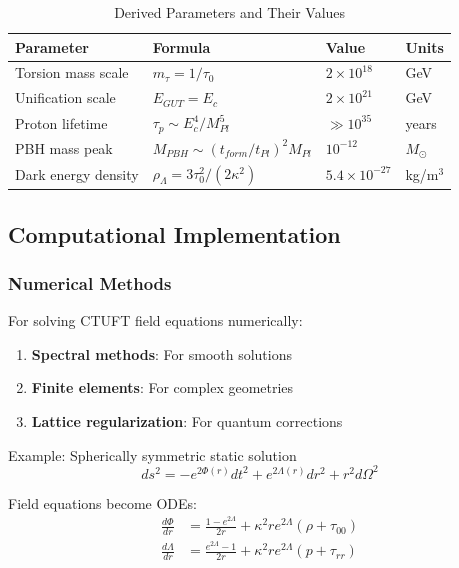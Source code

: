 \begin{table}[htbp]
\centering
\caption{Derived Parameters and Their Values}
\begin{tabular}{@{}llll@{}}
\toprule
\textbf{Parameter} & \textbf{Formula} & \textbf{Value} & \textbf{Units} \\
\midrule
Torsion mass scale & $m_\tau = 1/\tau_0$ & $2 \times 10^{18}$ & GeV \\
Unification scale & $E_{GUT} = E_c$ & $2 \times 10^{21}$ & GeV \\
Proton lifetime & $\tau_p \sim E_c^4/M_{Pl}^5$ & $\gg 10^{35}$ & years \\
PBH mass peak & $M_{PBH} \sim (t_{form}/t_{Pl})^2 M_{Pl}$ & $10^{-12}$ & $M_\odot$ \\
Dark energy density & $\rho_\Lambda = 3\tau_0^2/(2\kappa^2)$ & $5.4 \times 10^{-27}$ & kg/m$^3$ \\
\bottomrule
\end{tabular}
\label{tab:derived_params}
\end{table}

\subsection{Computational Implementation}

\subsubsection{Numerical Methods}

For solving CTUFT field equations numerically:

\begin{enumerate}
    \item \textbf{Spectral methods}: For smooth solutions
    \item \textbf{Finite elements}: For complex geometries
    \item \textbf{Lattice regularization}: For quantum corrections
\end{enumerate}

Example: Spherically symmetric static solution
\begin{equation}
    ds^2 = -e^{2\Phi(r)}dt^2 + e^{2\Lambda(r)}dr^2 + r^2 d\Omega^2
\end{equation}

Field equations become ODEs:
\begin{align}
    \frac{d\Phi}{dr} &= \frac{1 - e^{2\Lambda}}{2r} + \kappa^2 r e^{2\Lambda}(\rho + \tau_{00}) \\
    \frac{d\Lambda}{dr} &= \frac{e^{2\Lambda} - 1}{2r} + \kappa^2 r e^{2\Lambda}(p + \tau_{rr})
\end{align}

